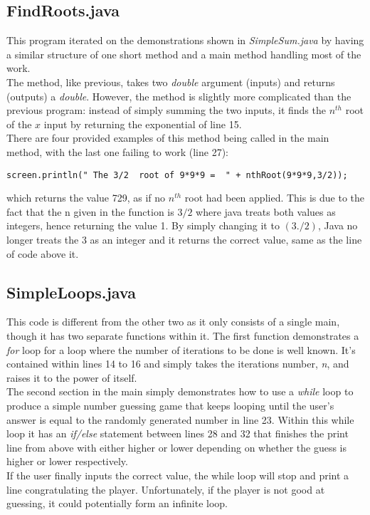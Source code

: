 \documentclass{article}
\begin{document}
\begin{multicols}{2}
		\subsection{FindRoots.java}
			This program iterated on the demonstrations shown in \textit{SimpleSum.java} by having a similar structure of one short method and a main method handling most of the work. \\ \indent The method, like previous, takes two \textit{double} argument (inputs) and returns (outputs) a \textit{double}. However, the method is slightly more complicated than the previous program: instead of simply summing the two inputs, it finds the $n^{th}$ root of the $x$ input by returning the exponential of line 15. \\ \indent There are four provided examples of this method being called in the main method, with the last one failing to work (line 27):
			\begin{lstlisting}
screen.println(" The 3/2  root of 9*9*9 =  " + nthRoot(9*9*9,3/2));
			\end{lstlisting} 
			which returns the value 729, as if no $n^{th}$ root had been applied. This is due to the fact that the n given in the function is $3/2$ where java treats both values as integers, hence returning the value 1. By simply changing it to $(3./2)$, Java no longer treats the 3 as an integer and it returns the correct value, same as the line of code above it.
		\subsection{SimpleLoops.java}
			This code is different from the other two as it only consists of a single main, though it has two separate functions within it.
			The first function demonstrates a \textit{for} loop for a loop where the number of iterations to be done is well known. It's contained within lines 14 to 16 and simply takes the iterations number, \textit{n}, and raises it to the power of itself. \\ \indent The second section in the main simply demonstrates how to use a \textit{while} loop to produce a simple number guessing game that keeps looping until the user's answer is equal to the randomly generated number in line 23. Within this while loop it has an \textit{if/else} statement between lines 28 and 32 that finishes the print line from above with either higher or lower depending on whether the guess is higher or lower respectively. \\ \indent If the user finally inputs the correct value, the while loop will stop and print a line congratulating the player. Unfortunately, if the player is not good at guessing, it could potentially form an infinite loop.

\end{multicols}
\end{document}
